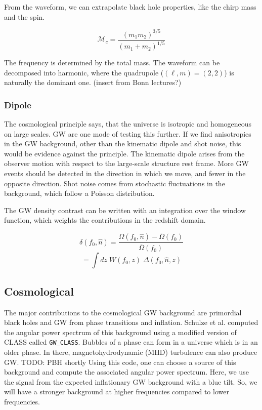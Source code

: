 From the waveform, we can extrapolate black hole properties, like the chirp mass and the spin. 

\begin{equation}
    \mathcal{M}_c = \frac{(m_1m_2)^{3/5}}{(m_1+m_2)^{1/5}}
\end{equation}

The frequency is determined by the total mass. 
The waveform can be decomposed into harmonic, where the quadrupole ($(\ell, m)=(2,2)$) is naturally the dominant one. 
(insert from Bonn lectures?)


\subsubsection{Dipole}
The cosmological principle says, that the universe is isotropic and homogeneous on large scales. GW are one mode of testing this further. If we find anisotropies in the GW background, other than the kinematic dipole and shot noise, this would be evidence against the principle.
The kinematic dipole arises from the observer motion with respect to the large-scale structure rest frame. More GW events should be detected in the direction in which we move, and fewer in the opposite direction. Shot noise comes from stochastic fluctuations in the background, which follow a Poisson distribution.

The GW density contrast can be written with an integration over the window function, which weights the contributions in the redshift domain.

\begin{equation}
    \delta(f_0, \hat{n}) = \frac{\Omega(f_0, \hat{n})-\overline{\Omega}(f_0)}{\overline{\Omega}(f_0)}
\end{equation}
\begin{equation}
    = \int dz \; W(f_0, z) \; \Delta(f_0, \hat{n}, z)
\end{equation}

\subsection{Cosmological}
\label{cosmo_bg}
The major contributions to the cosmological GW background are primordial
black holes and GW from phase transitions and inflation.
Schulze et al. \cite{schulze_gw_class_2023} computed the angular power spectrum of this background using a modified version of CLASS \cite{blas_cosmic_2011} called {\tt GW\_CLASS}.
Bubbles of a phase can form in a universe which is in an older phase. In there, magnetohydrodynamic (MHD) turbulence can also produce GW.
TODO: PBH shortly
Using this code, one can choose a source of this background and compute the associated angular power spectrum. Here, we use the signal from the expected inflationary GW background with a blue tilt. So, we will have a stronger background at higher frequencies compared to lower frequencies. 


